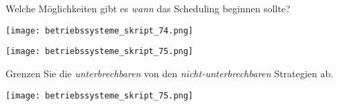 \documentclass{article}
\begin{document}
\begin{tcolorbox}[colback=white!10!white,colframe=lightgray!75!black,
  savelowerto=\jobname_ex.tex,breakable,enhanced,lines before break=40]

\begin{center}
Welche Möglichkeiten gibt es 
\textit{wann
} das Scheduling beginnen sollte?

\end{center}

\tcblower

\justifying
\begin{center}
\texttt{[image: betriebssysteme\_skript\_74.png]}
\end{center}
\begin{center}
\texttt{[image: betriebssysteme\_skript\_75.png]}
\end{center}

\end{tcolorbox}
\begin{tcolorbox}[colback=white!10!white,colframe=lightgray!75!black,
  savelowerto=\jobname_ex.tex,breakable,enhanced,lines before break=40]

\begin{center}
Grenzen Sie die 
\textit{unterbrechbaren
} von den 
\textit{nicht-unterbrechbaren
} Strategien ab.

\end{center}

\tcblower

\justifying
\begin{center}
\texttt{[image: betriebssysteme\_skript\_75.png]}
\end{center}

\end{tcolorbox}
\end{document}
